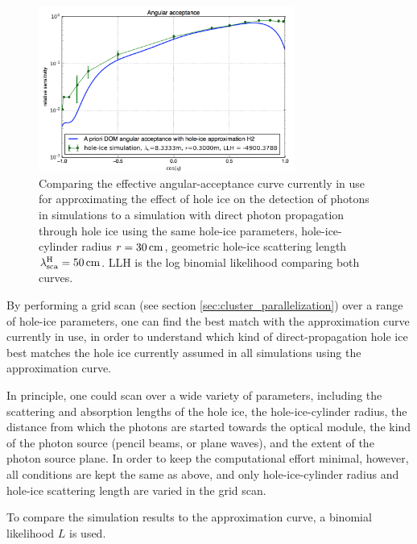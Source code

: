 \begin{figure}[htbp]
  \centering
  \includegraphics[width=0.75\textwidth]{img/angular-acceptance-karle-h2-vs-reference}
  \caption{Comparing the effective angular-acceptance curve currently in use for approximating the effect of hole ice on the detection of photons in simulations to a simulation with direct photon propagation through hole ice using the same hole-ice parameters, hole-ice-cylinder radius $r=30\text{\,cm}$, geometric hole-ice scattering length $\lambda_\text{sca}^\text{H} = 50\text{\,cm}$. LLH is the log binomial likelihood comparing both curves.}
  \label{fig:chie4Ite}
\end{figure}

By performing a grid scan (see section
\ref{sec:cluster_parallelization}) over a range of hole-ice parameters,
one can find the best match with the approximation curve currently in
use, in order to understand which kind of direct-propagation hole ice
best matches the hole ice currently assumed in all simulations using the
approximation curve.


In principle, one could scan over a wide variety of parameters,
including the scattering and absorption lengths of the hole ice, the
hole-ice-cylinder radius, the distance from which the photons are
started towards the optical module, the kind of the photon source
(pencil beams, or plane waves), and the extent of the photon source
plane. In order to keep the computational effort minimal, however, all
conditions are kept the same as above, and only hole-ice-cylinder radius
and hole-ice scattering length are varied in the grid scan.

To compare the simulation results to the approximation curve, a binomial
likelihood \(L\) is used.

